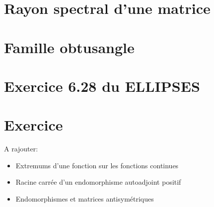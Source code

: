 \section{Rayon spectral d'une matrice} \label{rayon_spectral}


%

\section{Famille obtusangle}


\section{Exercice 6.28 du ELLIPSES}


\section{Exercice}


A rajouter:
\begin{itemize}
    \item Extremums d'une fonction sur les fonctions continues
    \item Racine carrée d'un endomorphisme autoadjoint positif
    \item Endomorphismes et matrices antisymétriques
\end{itemize}